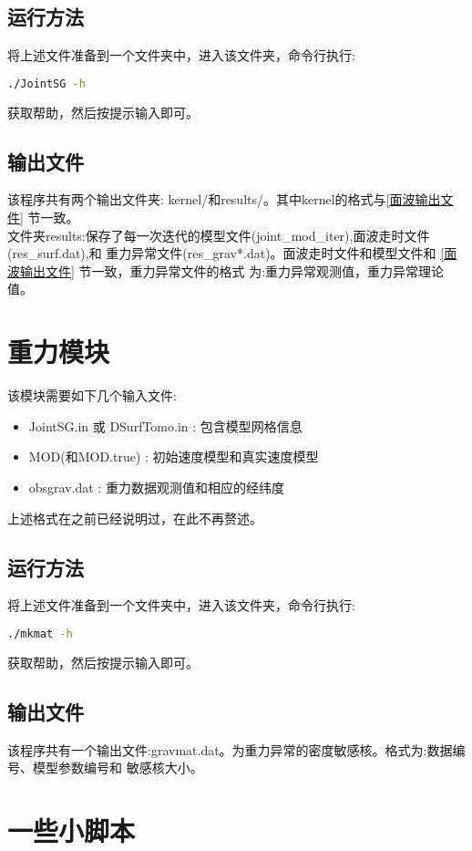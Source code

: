 \documentclass[10p,UTF8]{ctexart}
\begin{document}
    \subsection{运行方法}
    将上述文件准备到一个文件夹中，进入该文件夹，命令行执行:
    \begin{lstlisting}[language=bash]
     ./JointSG -h
    \end{lstlisting}
    获取帮助，然后按提示输入即可。

    \subsection{输出文件}
    该程序共有两个输出文件夹: kernel/和results/。其中kernel的格式与\ref{面波输出文件} 节一致。\\
    文件夹results:保存了每一次迭代的模型文件(joint\_mod\_iter\*),面波走时文件(res\_surf\*.dat),和
    重力异常文件(res\_grav*.dat)。面波走时文件和模型文件和 \ref{面波输出文件} 节一致，重力异常文件的格式
    为:重力异常观测值，重力异常理论值。
 

    \section{重力模块}
    该模块需要如下几个输入文件:
    \begin{itemize}
        \item JointSG.in 或 DSurfTomo.in : 包含模型网格信息
        \item MOD(和MOD.true) : 初始速度模型和真实速度模型
        \item obsgrav.dat : 重力数据观测值和相应的经纬度
    \end{itemize}
    上述格式在之前已经说明过，在此不再赘述。

    \subsection{运行方法}
    将上述文件准备到一个文件夹中，进入该文件夹，命令行执行:
    \begin{lstlisting}[language=bash]
     ./mkmat -h
    \end{lstlisting}
    获取帮助，然后按提示输入即可。
    \subsection{输出文件}
    该程序共有一个输出文件:gravmat.dat。为重力异常的密度敏感核。格式为:数据编号、模型参数编号和
    敏感核大小。


    \section{一些小脚本}
\end{document}
